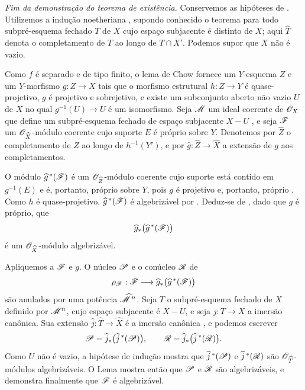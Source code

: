 \begin{env}[5.3.5]
\label{III.5.3.5}
\emph{Fim da demonstração do teorema de existência.}
Conservemos as hipóteses de . Utilizemos a indução
noetheriana , supondo conhecido o teorema para todo
subpré-esquema fechado $T$ de $X$ cujo espaço subjacente é distinto
de $X$; aqui $\widehat{T}$ denota o completamento de $T$ ao longo de
$T\cap X'$. Podemos supor que $X$ não é vazio.

Como $f$ é separado e de tipo finito, o lema de Chow
 fornece um $Y$-esquema $Z$ e um $Y$-morfismo
$g:Z\to X$ tais que o morfismo estrutural $h:Z\to Y$ é
quase-projetivo, $g$ é projetivo e sobrejetivo, e existe um
subconjunto aberto não vazio $U$ de $X$ no qual
$g^{-1}(U)\to U$ é um isomorfismo. Seja $\mathscr{M}$ um ideal coerente
de $\mathscr{O}_X$ que define um subpré-esquema fechado de espaço subjacente
$X-U$ , e seja $\mathscr{F}$ um
$\mathscr{O}_{\widehat{X}}$-módulo coerente cujo suporte $E$ é próprio sobre $Y$.
Denotemos por $\widehat{Z}$ o completamento de $Z$ ao longo de
$h^{-1}(Y')$, e por
$\widehat{g}:\widehat{Z}\to\widehat{X}$ a extensão de $g$ aos
completamentos.

O módulo $\widehat{g}^{\,*}(\mathscr{F})$ é um
$\mathscr{O}_{\widehat{Z}}$-módulo coerente cujo suporte está contido em
$g^{-1}(E)$ e é, portanto, próprio sobre $Y$, pois $g$ é
projetivo e, portanto, próprio . Como $h$ é
quase-projetivo, $\widehat{g}^{\,*}(\mathscr{F})$ é algebrizável por
.
Deduz-se de , dado que $g$ é próprio, que
\[
  \widehat{g}_*
  \bigl(\widehat{g}^{\,*}(\mathscr{F})\bigr)
\]
é um $\mathscr{O}_{\widehat{X}}$-módulo algebrizável.

Apliquemos  a $\mathscr{F}$ e $g$. O núcleo $\mathscr{P}$
e o conúcleo $\mathscr{R}$ de
\[
  \rho_{\mathscr{F}}:
  \mathscr{F}\longrightarrow
  \widehat{g}_*\bigl(\widehat{g}^{\,*}(\mathscr{F})\bigr)
\]
são anulados por uma potência $\widehat{\mathscr{M}}^{\,n}$. Seja $T$
o subpré-esquema fechado de $X$ definido por $\mathscr{M}^n$, cujo
espaço subjacente é $X-U$, e seja $j:T\to X$ a imersão
canônica. Sua extensão
$\widehat{j}:\widehat{T}\to\widehat{X}$ é a imersão canônica
, e podemos escrever
\[
  \mathscr{P}=
  \widehat{j}_*\bigl(\widehat{j}^{\,*}(\mathscr{P})\bigr),
  \qquad
  \mathscr{R}=
  \widehat{j}_*\bigl(\widehat{j}^{\,*}(\mathscr{R})\bigr).
\]
Como $U$ não é vazio, a hipótese de indução mostra que
$\widehat{j}^{\,*}(\mathscr{P})$ e
$\widehat{j}^{\,*}(\mathscr{R})$ são $\mathscr{O}_{\widehat{T}}$-módulos
algebrizáveis. O Lema  mostra então
que $\mathscr{P}$ e $\mathscr{R}$ são algebrizáveis, e
 demonstra finalmente que $\mathscr{F}$ é algebrizável.
\end{env}



